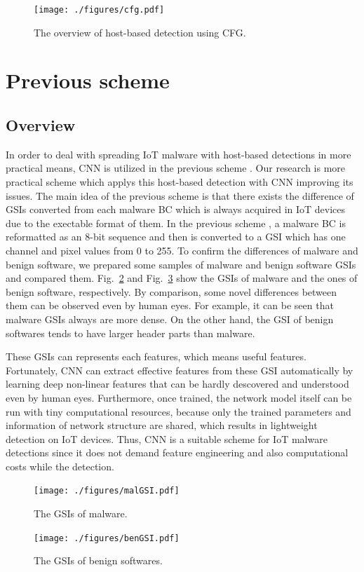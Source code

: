 \documentclass{ieeeaccess}
\newcommand{\myfigurename}{Fig.}
\begin{document}
\begin{figure}[t]
 \centering
 \texttt{[image: ./figures/cfg.pdf]}
 \caption{The overview of host-based detection using CFG.} 
 \label{fig:cfg}
\end{figure}

\section{Previous scheme} \label{sec:previous_scheme}
\subsection{Overview} 
In order to deal with spreading IoT malware with host-based detections in more practical means, CNN is utilized in the previous scheme \cite{previous}.
Our research is more practical scheme which applys this host-based detection with CNN improving its issues.
The main idea of the previous scheme is that there exists the difference of GSIs converted from each malware BC which is always acquired in IoT devices due to the exectable format of them.
In the previous scheme \cite{previous}, a malware BC is reformatted as an 8-bit sequence and then is converted to a GSI which has one channel and pixel values from 0 to 255.
To confirm the differences of malware and benign software, we prepared some samples of malware and benign software GSIs and compared them.
\myfigurename~\ref{fig:malGSI} and \myfigurename~\ref{fig:benGSI} show the GSIs of malware and the ones of benign software, respectively.
By comparison, some novel differences between them can be observed even by human eyes.
For example, it can be seen that malware GSIs always are more dense.
On the other hand, the GSI of benign softwares tends to have larger header parts than malware.

These GSIs can represents each features, which means useful features.
Fortunately, CNN can extract effective features from these GSI automatically by learning deep non-linear features that can be hardly descovered and understood even by human eyes.
Furthermore, once trained, the network model itself can be run with tiny computational resources, because only the trained parameters and information of network structure are shared, which results in lightweight detection on IoT devices.
Thus, CNN is a suitable scheme for IoT malware detections since it does not demand feature engineering and also computational costs while the detection.

\begin{figure}[t]
 \centering
 \texttt{[image: ./figures/malGSI.pdf]}
 \caption{The GSIs of malware.} 
 \label{fig:malGSI}
\end{figure}
\begin{figure}[t]
 \centering
 \texttt{[image: ./figures/benGSI.pdf]}
 \caption{The GSIs of benign softwares.} 
 \label{fig:benGSI}
\end{figure}
\end{document}
